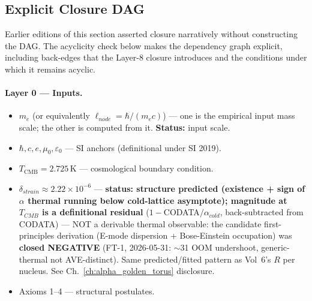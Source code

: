 \subsection*{Explicit Closure DAG}

Earlier editions of this section asserted closure narratively without constructing the DAG. The acyclicity check below makes the dependency graph explicit, including back-edges that the Layer-8 closure introduces and the conditions under which it remains acyclic.

\paragraph{Layer 0 --- Inputs.}
\begin{itemize}
    \item $m_e$ (or equivalently $\ell_{node} = \hbar/(m_e c)$) --- one is the empirical input mass scale; the other is computed from it. \textbf{Status:} input scale.
    \item $\hbar, c, e, \mu_0, \varepsilon_0$ --- SI anchors (definitional under SI 2019).
    \item $T_{\text{CMB}} = 2.725\,\text{K}$ --- cosmological boundary condition.
    \item $\delta_{strain} \approx 2.22\times 10^{-6}$ --- \textbf{status: structure predicted (existence + sign of $\alpha$ thermal running below cold-lattice asymptote); magnitude at $T_{CMB}$ is a definitional residual} ($1-$CODATA$/\alpha_{cold}$, back-subtracted from CODATA) --- NOT a derivable thermal observable: the candidate first-principles derivation (E-mode dispersion + Bose-Einstein occupation) was \textbf{closed NEGATIVE} (FT-1, 2026-05-31: $\sim$31 OOM undershoot, generic-thermal not AVE-distinct). Same predicted/fitted pattern as Vol~6's $R$ per nucleus. See Ch.~\ref{ch:alpha_golden_torus} disclosure.
    \item Axioms 1--4 --- structural postulates.
\end{itemize}

